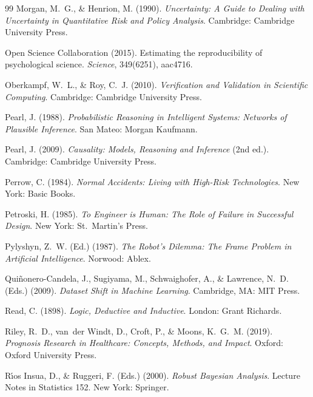 \documentclass[11pt,a4paper]{article}
\begin{document}
\begin{thebibliography}{99}
Morgan, M.~G., \& Henrion, M. (1990). \emph{Uncertainty: A Guide to
Dealing with Uncertainty in Quantitative Risk and Policy Analysis}.
Cambridge: Cambridge University Press.

Open Science Collaboration (2015). Estimating the reproducibility of
psychological science. \emph{Science}, 349(6251), aac4716.

Oberkampf, W.~L., \& Roy, C.~J. (2010). \emph{Verification and
Validation in Scientific Computing}. Cambridge: Cambridge University
Press.

Pearl, J. (1988). \emph{Probabilistic Reasoning in Intelligent Systems:
Networks of Plausible Inference}. San Mateo: Morgan Kaufmann.

Pearl, J. (2009). \emph{Causality: Models, Reasoning and Inference} (2nd
ed.). Cambridge: Cambridge University Press.

Perrow, C. (1984). \emph{Normal Accidents: Living with High-Risk
Technologies}. New York: Basic Books.

Petroski, H. (1985). \emph{To Engineer is Human: The Role of Failure in
Successful Design}. New York: St.~Martin's Press.

Pylyshyn, Z.~W. (Ed.) (1987). \emph{The Robot's Dilemma: The Frame
Problem in Artificial Intelligence}. Norwood: Ablex.

Qui\~nonero-Candela, J., Sugiyama, M., Schwaighofer, A., \& Lawrence,
N.~D. (Eds.) (2009). \emph{Dataset Shift in Machine Learning}.
Cambridge, MA: MIT Press.

Read, C. (1898). \emph{Logic, Deductive and Inductive}. London: Grant
Richards.

Riley, R.~D., van~der Windt, D., Croft, P., \& Moons, K.~G.~M.
(2019). \emph{Prognosis Research in Healthcare: Concepts, Methods, and
Impact}. Oxford: Oxford University Press.

R\'{\i}os Insua, D., \& Ruggeri, F. (Eds.) (2000). \emph{Robust Bayesian
Analysis}. Lecture Notes in Statistics 152. New York: Springer.


\end{thebibliography}
\end{document}
